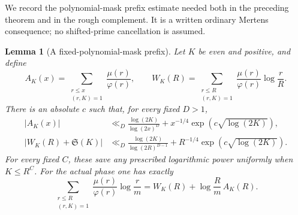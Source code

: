 \documentclass[11pt,a4paper]{article}
\newtheorem{lemma}[theorem]{Lemma}
\theoremstyle{definition}
\theoremstyle{remark}
\begin{document}
We record the polynomial-mask prefix estimate needed both in the
preceding theorem and in the rough complement.  It is a written
ordinary Mertens consequence; no shifted-prime cancellation is
assumed.

\begin{lemma}[A fixed-polynomial-mask prefix]
\label{lem:sector-masked-prefix}
Let $K$ be even and positive, and define
\[
 A_K(x)=\sum_{\substack{r\leq x\\(r,K)=1}}\frac{\mu(r)}{\varphi(r)},
 \qquad
 W_K(R)=\sum_{\substack{r\leq R\\(r,K)=1}}
                          \frac{\mu(r)}{\varphi(r)}\log\frac rR.
\]
There is an absolute $c$ such that, for every fixed $D>1$,
\begin{align*}
 |A_K(x)|&\ll_D
       \frac{\log(2K)}{\log(2x)^D}
                 +x^{-1/4}\exp(c\sqrt{\log(2K)}),\\
 |W_K(R)+\mathfrak S(K)|&\ll_D
       \frac{\log(2K)}{\log(2R)^{D-1}}
                 +R^{-1/4}\exp(c\sqrt{\log(2K)}).
\end{align*}
For every fixed $C$, these save any prescribed logarithmic power
uniformly when $K\leq R^C$.  For the actual phase one has exactly
\begin{equation}
 \sum_{\substack{r\leq R\\(r,K)=1}}
                 \frac{\mu(r)}{\varphi(r)}\log\frac rm
          =W_K(R)+\log\frac Rm\,A_K(R).
 \label{eq:sector-shifted-prefix}
\end{equation}
\end{lemma}
\end{document}
